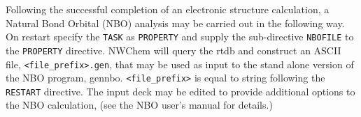 Following the successful completion of an electronic structure
calculation, a Natural Bond Orbital (NBO) analysis may be carried out
in the following way.  On restart specify the \verb+TASK+ as \verb+PROPERTY+ and
supply the sub-directive \verb+NBOFILE+ to the \verb+PROPERTY+ directive.  NWChem
will query the rtdb and construct an ASCII file,
\verb+<file_prefix>.gen+, that may be used as input to the stand alone
version of the NBO program, gennbo.  \verb+<file_prefix>+ is equal to
string following the \verb+RESTART+ directive.  The input deck may be edited
to provide additional options to the NBO calculation, (see the NBO
user's manual for details.)  

